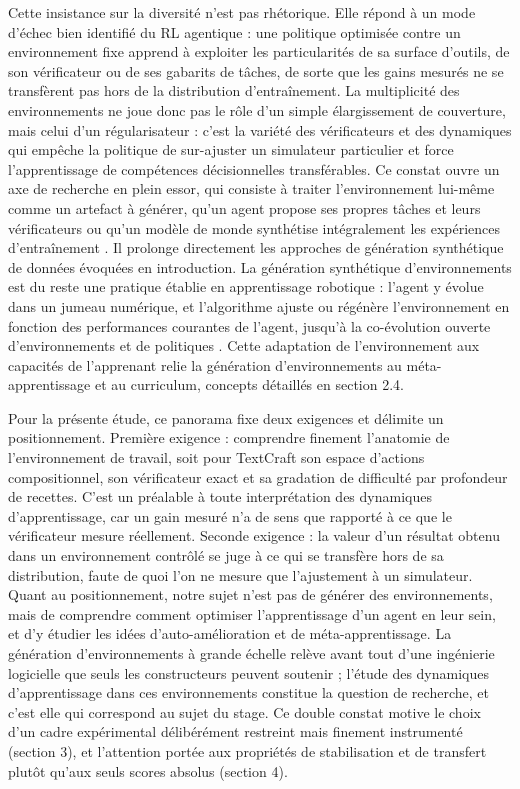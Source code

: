 \documentclass[11pt,a4paper]{article}
\begin{document}
Cette insistance sur la diversité n'est pas rhétorique. Elle répond à un mode d'échec bien identifié du RL agentique : une politique optimisée contre un environnement fixe apprend à exploiter les particularités de sa surface d'outils, de son vérificateur ou de ses gabarits de tâches, de sorte que les gains mesurés ne se transfèrent pas hors de la distribution d'entraînement. La multiplicité des environnements ne joue donc pas le rôle d'un simple élargissement de couverture, mais celui d'un régularisateur : c'est la variété des vérificateurs et des dynamiques qui empêche la politique de sur-ajuster un simulateur particulier et force l'apprentissage de compétences décisionnelles transférables. Ce constat ouvre un axe de recherche en plein essor, qui consiste à traiter l'environnement lui-même comme un artefact à générer, qu'un agent propose ses propres tâches et leurs vérificateurs \cite{zhou2025sca} ou qu'un modèle de monde synthétise intégralement les expériences d'entraînement \cite{dreamgym2025}. Il prolonge directement les approches de génération synthétique de données évoquées en introduction. La génération synthétique d'environnements est du reste une pratique établie en apprentissage robotique : l'agent y évolue dans un jumeau numérique, et l'algorithme ajuste ou régénère l'environnement en fonction des performances courantes de l'agent, jusqu'à la co-évolution ouverte d'environnements et de politiques \cite{wang2019poet}. Cette adaptation de l'environnement aux capacités de l'apprenant relie la génération d'environnements au méta-apprentissage et au curriculum, concepts détaillés en section 2.4.

Pour la présente étude, ce panorama fixe deux exigences et délimite un positionnement. Première exigence : comprendre finement l'anatomie de l'environnement de travail, soit pour TextCraft son espace d'actions compositionnel, son vérificateur exact et sa gradation de difficulté par profondeur de recettes. C'est un préalable à toute interprétation des dynamiques d'apprentissage, car un gain mesuré n'a de sens que rapporté à ce que le vérificateur mesure réellement. Seconde exigence : la valeur d'un résultat obtenu dans un environnement contrôlé se juge à ce qui se transfère hors de sa distribution, faute de quoi l'on ne mesure que l'ajustement à un simulateur. Quant au positionnement, notre sujet n'est pas de générer des environnements, mais de comprendre comment optimiser l'apprentissage d'un agent en leur sein, et d'y étudier les idées d'auto-amélioration et de méta-apprentissage. La génération d'environnements à grande échelle relève avant tout d'une ingénierie logicielle que seuls les constructeurs peuvent soutenir ; l'étude des dynamiques d'apprentissage dans ces environnements constitue la question de recherche, et c'est elle qui correspond au sujet du stage. Ce double constat motive le choix d'un cadre expérimental délibérément restreint mais finement instrumenté (section 3), et l'attention portée aux propriétés de stabilisation et de transfert plutôt qu'aux seuls scores absolus (section 4).
\end{document}
